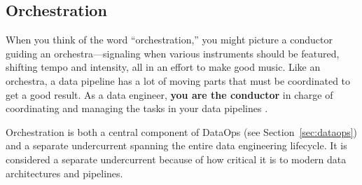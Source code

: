 \documentclass{article}
\begin{document}
\subsection{Orchestration}
\label{sec:orchestration}
When you think of the word ``orchestration,'' you might picture a conductor guiding an orchestra---signaling when various instruments should be featured, shifting tempo and intensity, all in an effort to make good music. Like an orchestra, a data pipeline has a lot of moving parts that must be coordinated to get a good result. As a data engineer, \textbf{you are the conductor} in charge of coordinating and managing the tasks in your data pipelines \cite{reis2022fundamentals}.

Orchestration is both a central component of DataOps (see Section~\ref{sec:dataops}) and a separate undercurrent spanning the entire data engineering lifecycle. It is considered a separate undercurrent because of how critical it is to modern data architectures and pipelines.
\end{document}
